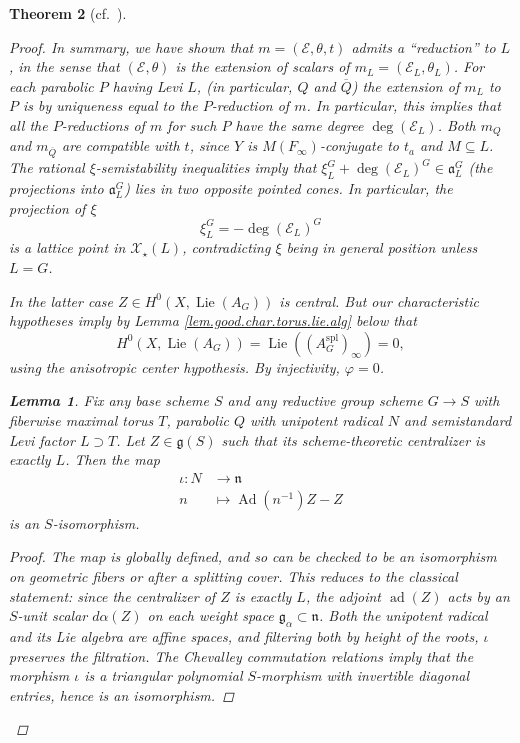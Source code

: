\documentclass[openany]{amsbook}
\newtheorem{theorem}{Theorem}[chapter]
\newtheorem{lemma}[theorem]{Lemma}
\theoremstyle{definition}
\theoremstyle{remark}
\numberwithin{equation}{section}
\newcommand{\cE}{\mathcal{E}}
\newcommand{\cX}{\mathcal{X}}
\newcommand{\ol}[1]{\overline{#1}}
\renewcommand{\phi}{\varphi}
\renewcommand{\-}{\operatorname{-}}
\renewcommand{\a}{\mathfrak{a}}
\newcommand{\on}[1]{\operatorname{#1}}
\renewcommand{\fg}{\mathfrak{g}}
\newcommand{\Lie}{\on{Lie}}
\newcommand{\Ad}{\on{Ad}}
\newcommand{\spl}{\mathrm{spl}}
\begin{document}
\begin{theorem}[{{cf.\ \cite[Th\'{e}or\`{e}me 10.1.1]{CLI}}}]
\begin{proof}
        In summary, we  have shown that $m = (\cE, \theta, t)$ admits a ``reduction'' to $L$, in the sense that $(\cE, \theta)$ is the extension of scalars of $m_L = (\cE_L, \theta_L)$. For each parabolic $P$ having Levi $L$, (in particular, $Q$ and $\ol{Q}$) the extension of $m_L$ to $P$ is by uniqueness equal to the $P$-reduction of $m$. In particular, this implies that all the $P$-reductions of $m$ for such $P$ have the same degree $\deg(\cE_L)$. Both $m_Q$ and $m_{\ol{Q}}$ are compatible with $t$, since $Y$ is $M(F_\infty)$-conjugate to $t_a$ and $M \subseteq L$. The rational $\xi$-semistability inequalities imply that $\xi_L^G + \deg(\cE_L)^G \in \a_L^G$ (the projections into $\a_L^G$) lies in two opposite pointed cones. In particular, the projection of $\xi$
        $$
            \xi_L^G = - \deg(\cE_L)^G
        $$
        is a lattice point in $\cX_\star(L)$, contradicting $\xi$ being in general position unless $L = G$. 
        
        In the latter case $Z \in H^0(X, \Lie(A_G))$ is central. But our characteristic hypotheses imply by Lemma \ref{lem.good.char.torus.lie.alg} below that
        $$
            H^0(X, \Lie(A_G)) = \Lie((A_G^{\spl})_\infty) = 0,
        $$
        using the anisotropic center hypothesis. By injectivity, $\phi = 0$. 
        
        
        
        
        
        
        
                
                
        
        
                                                                        
        

\begin{lemma}\label{lem.unip.adjoint.isom}
    Fix any base scheme $S$ and any reductive group scheme $G \to S$ with fiberwise maximal torus $T$, parabolic $Q$ with unipotent radical $N$ and semistandard Levi factor $L \supset T$. Let $Z \in \fg(S)$ such that its scheme-theoretic centralizer is exactly $L$. Then the map
    \begin{align*}
        \iota : N &\to \mathfrak{n} \\
        n &\mapsto \Ad(n^{-1})Z - Z
    \end{align*}
    is an $S$-isomorphism.
    \begin{proof}
        The map is globally defined, and so can be checked to be an isomorphism on geometric fibers or after a splitting cover. This reduces to the classical statement: since the centralizer of $Z$ is exactly $L$, the adjoint $\on{ad}(Z)$ acts by an $S$-unit scalar $d\alpha(Z)$ on each weight space $\fg_\alpha \subset \mathfrak{n}$. Both the unipotent radical and its Lie algebra are affine spaces, and filtering both by height of the roots, $\iota$ preserves the filtration. The Chevalley commutation relations imply that the morphism $\iota$ is a triangular polynomial $S$-morphism with invertible diagonal entries, hence is an isomorphism. 
    \end{proof}
\end{lemma}


\end{proof}
\end{theorem}
\end{document}
